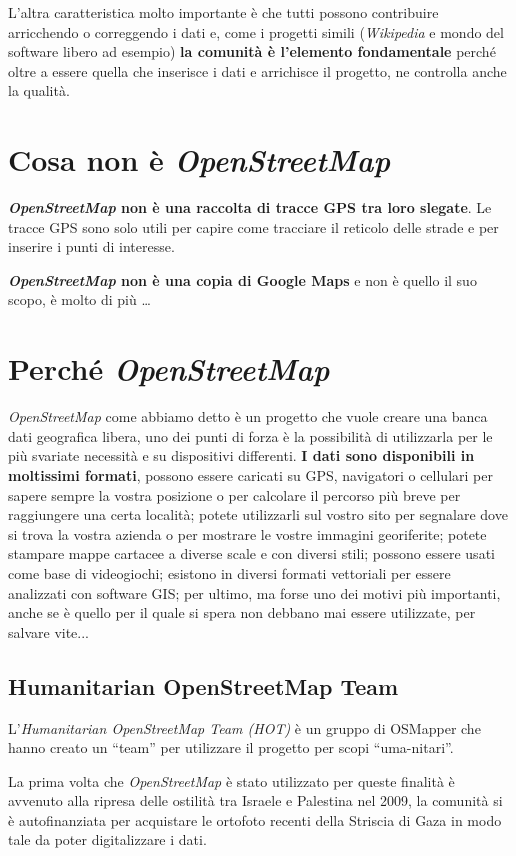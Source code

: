 \documentclass[a4paper,twoside,12pt,]{article}
\newcommand{\osm}{\emph{OpenStreetMap}\xspace}
\newcommand{\gps}{GPS\xspace}
\newcommand{\pro}[1]{\emph{#1}}
\begin{document}
L'altra caratteristica molto importante è che tutti possono contribuire arricchendo o correggendo i dati e, come i progetti simili (\pro{Wikipedia} e mondo del software libero ad esempio) \textbf{la comunità è l'elemento fondamentale} perché oltre a essere quella che inserisce i dati e arrichisce il progetto, ne controlla anche la qualità.
\section{Cosa non è \osm}
\textbf{\osm non è una raccolta di tracce \gps tra loro slegate}. Le tracce \gps sono solo utili per capire come tracciare il reticolo delle strade e per inserire i punti di interesse.

\textbf{\osm non è una copia di Google Maps} e non è quello il suo scopo, è molto di più \dots

\section{Perché \osm}
\osm come abbiamo detto è un progetto che vuole creare una banca dati geografica libera, uno dei punti di forza è la possibilità di utilizzarla per le più svariate necessità e su  dispositivi differenti. \textbf{I dati sono disponibili in moltissimi formati}, possono essere caricati su GPS, navigatori o cellulari per sapere sempre la vostra posizione o per calcolare il percorso più breve per raggiungere una certa località; potete utilizzarli sul vostro sito per segnalare dove si trova la vostra azienda o per mostrare le vostre immagini georiferite; potete stampare mappe cartacee a diverse scale e con diversi stili; possono essere usati come base di videogiochi; esistono in diversi formati vettoriali per essere analizzati con software GIS; per ultimo, ma forse uno dei motivi più importanti, anche se è quello per il quale si spera non debbano mai essere utilizzate, per salvare vite...
\subsection{Humanitarian OpenStreetMap Team}
L'\pro{Humanitarian OpenStreetMap Team (HOT)} è un gruppo di OSMapper che hanno creato un ``team'' per utilizzare il progetto per scopi ``uma-nitari''.

La prima volta che \osm è stato utilizzato per queste finalità è avvenuto alla ripresa delle ostilità tra Israele e Palestina nel 2009, la comunità si è autofinanziata per acquistare le ortofoto recenti della Striscia di Gaza in modo tale da poter digitalizzare i dati.
\end{document}
